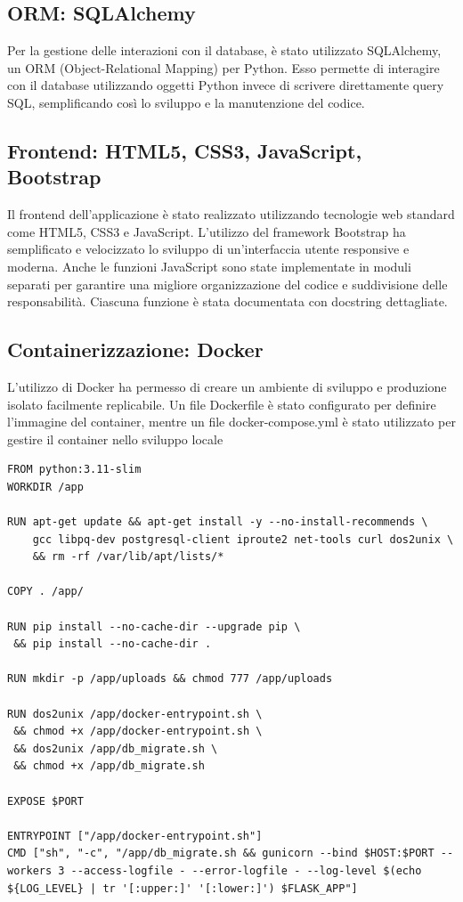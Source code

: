 \documentclass[12pt,a4paper,oneside]{report}
\begin{document}
\subsection{ORM: SQLAlchemy}
Per la gestione delle interazioni con il database, è stato utilizzato SQLAlchemy, un ORM (Object-Relational Mapping) \cite{orm} per Python.
Esso permette di interagire con il database utilizzando oggetti Python invece di scrivere direttamente query SQL, semplificando così lo sviluppo e la manutenzione del codice.


\subsection{Frontend: HTML5, CSS3, JavaScript, Bootstrap}
Il frontend dell'applicazione è stato realizzato utilizzando tecnologie web standard come HTML5, CSS3 e JavaScript. L'utilizzo del framework Bootstrap ha semplificato e velocizzato lo sviluppo di un'interfaccia utente responsive e moderna.
Anche le funzioni JavaScript sono state implementate in moduli separati per garantire una migliore organizzazione del codice e suddivisione delle responsabilità.
Ciascuna funzione è stata documentata con docstring dettagliate.

\subsection{Containerizzazione: Docker}
L'utilizzo di Docker ha permesso di creare un ambiente di sviluppo e produzione isolato facilmente replicabile.
Un file Dockerfile è stato configurato per definire l'immagine del container, mentre un file docker-compose.yml è stato utilizzato per gestire il container nello sviluppo locale
\begin{lstlisting}[basicstyle=\small\ttfamily, breaklines=true, caption={Dockerfile}]
FROM python:3.11-slim
WORKDIR /app

RUN apt-get update && apt-get install -y --no-install-recommends \
    gcc libpq-dev postgresql-client iproute2 net-tools curl dos2unix \
    && rm -rf /var/lib/apt/lists/*

COPY . /app/

RUN pip install --no-cache-dir --upgrade pip \
 && pip install --no-cache-dir .

RUN mkdir -p /app/uploads && chmod 777 /app/uploads

RUN dos2unix /app/docker-entrypoint.sh \
 && chmod +x /app/docker-entrypoint.sh \
 && dos2unix /app/db_migrate.sh \
 && chmod +x /app/db_migrate.sh

EXPOSE $PORT

ENTRYPOINT ["/app/docker-entrypoint.sh"]
CMD ["sh", "-c", "/app/db_migrate.sh && gunicorn --bind $HOST:$PORT --workers 3 --access-logfile - --error-logfile - --log-level $(echo ${LOG_LEVEL} | tr '[:upper:]' '[:lower:]') $FLASK_APP"]
\end{lstlisting}
\end{document}
